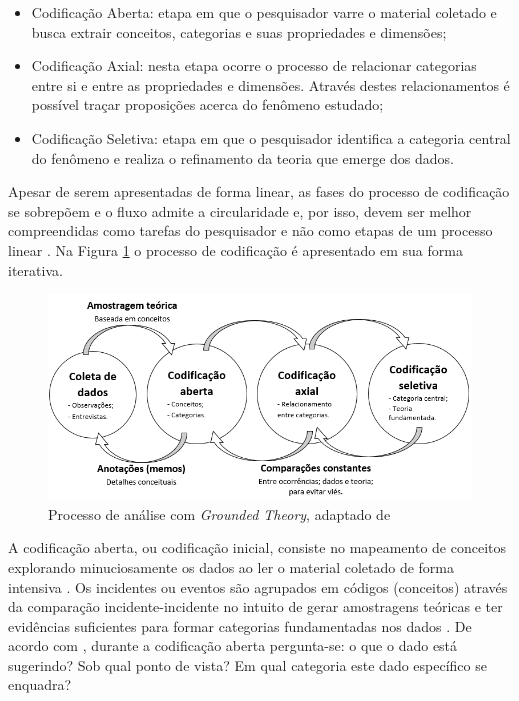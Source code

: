\begin{itemize}  
\item Codificação Aberta: etapa em que o pesquisador varre o material coletado e busca extrair conceitos, categorias e suas propriedades e dimensões;
\item Codificação Axial: nesta etapa ocorre o processo de relacionar categorias entre si e entre as propriedades e dimensões. Através destes relacionamentos é possível traçar proposições acerca do fenômeno estudado;
\item Codificação Seletiva: etapa em que o pesquisador identifica a categoria central do fenômeno e realiza o refinamento da teoria que emerge dos dados.
\end{itemize}

Apesar de serem apresentadas de forma linear, as fases do processo de codificação se sobrepõem e o fluxo admite a circularidade e, por isso, devem ser melhor compreendidas como tarefas do pesquisador e não como etapas de um processo linear \cite{bandeira:03}. Na Figura \ref{figura:GTprocesso} o processo de codificação é apresentado em sua forma iterativa.

\begin{figure}[h!]
\centering %
\includegraphics[width=15.5cm]{figuras/GTprocesso.png}
\caption{Processo de análise com \textit{Grounded Theory}, adaptado de }
\label{figura:GTprocesso}
\end{figure}

A codificação aberta, ou codificação inicial, consiste no mapeamento de conceitos explorando minuciosamente os dados ao ler o material coletado de forma intensiva \cite{conte:09}. Os incidentes ou eventos são agrupados em códigos (conceitos) através da comparação incidente-incidente no intuito de gerar amostragens teóricas e ter evidências suficientes para formar categorias fundamentadas nos dados \cite{bandeira:03}. De acordo com , durante a codificação aberta pergunta-se: o que o dado está sugerindo? Sob qual ponto de vista? Em qual categoria este dado específico se enquadra?

